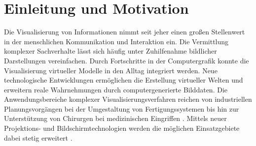 \chapter{Einleitung und Motivation}

\prever{
}

Die Visualisierung von Informationen nimmt seit jeher einen großen Stellenwert in der menschlichen Kommunikation und Interaktion ein. Die Vermittlung komplexer Sachverhalte lässt sich häufig unter Zuhilfenahme bildlicher Darstellungen vereinfachen. Durch Fortschritte in der Computergrafik konnte die Visualisierung virtueller Modelle in den Alltag integriert werden. Neue technologische Entwicklungen ermöglichen die Erstellung virtueller Welten und erweitern reale Wahrnehmungen durch computergenerierte Bilddaten. Die Anwendungsbereiche komplexer Visualisierungsverfahren reichen von industriellen Planungsvorgängen bei der Umgestaltung von Fertigungssystemen \cite{Lindskog2013} bis hin zur Unterstützung von Chirurgen bei medizinischen Eingriffen \cite{Kersten2013}. Mittels neuer Projektions- und Bildschirmtechnologien werden die möglichen Einsatzgebiete dabei stetig erweitert \cite{Carmigniani2011}.\\

